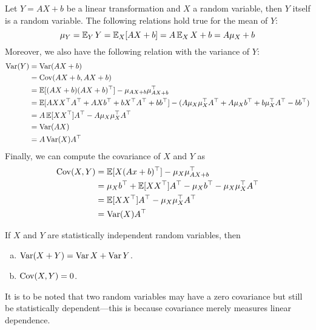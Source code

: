 Let \(Y = A X + b\) be a linear transformation and \(X\) a random variable, then
\(Y\) itself is a random variable. The following relations hold true for the
mean of \(Y\):
\[
    \mu_Y = \operatorname{\mathbb{E}}_Y Y = \operatorname{\mathbb{E}}_X[A X + b] = A \operatorname{\mathbb{E}}_X X + b = A \mu_X + b
\]
Moreover, we also have the following relation with the variance of \(Y\):
\begin{align*}
    \operatorname{Var}(Y)
     & = \operatorname{Var}(A X + b)                                                        \\
     & = \operatorname{Cov}(A X + b, A X + b)                                               \\
     & = \operatorname{\mathbb{E}}[(A X + b)(A X + b)^{\operatorname{\top}}] - \mu_{A X + b} \mu_{A X +
    b}^{\operatorname{\top}}                                                              \\
     & = \operatorname{\mathbb{E}}[
        A X X^{\operatorname{\top}} A^{\operatorname{\top}} + A X b^{\operatorname{\top}} + b X^{\operatorname{\top}} A^{\operatorname{\top}}
        + b b^{\operatorname{\top}}
    ]
    - (A \mu_X \mu_X^{\operatorname{\top}} A^{\operatorname{\top}} + A \mu_X b^{\operatorname{\top}}
    + b \mu_X^{\operatorname{\top}} A^{\operatorname{\top}} - b b^{\operatorname{\top}})                        \\
     & = A \operatorname{\mathbb{E}}[X X^{\operatorname{\top}}] A^{\operatorname{\top}} - A \mu_X \mu_X^{\operatorname{\top}}
    A^{\operatorname{\top}}                                                               \\
     & = \operatorname{Var}(A X)                                                            \\
     & = A \operatorname{Var}(X) A^{\operatorname{\top}}
\end{align*}
Finally, we can compute the covariance of \(X\) and \(Y\) as
\begin{align*}
    \operatorname{Cov}(X, Y)
     & = \operatorname{\mathbb{E}}[X (A x + b)^{\operatorname{\top}}] - \mu_X \mu_{A X + b}^{\operatorname{\top}}         \\
     & = \mu_X b^{\operatorname{\top}} + \operatorname{\mathbb{E}}[X X^{\operatorname{\top}}] A^{\operatorname{\top}}
    - \mu_X b^{\operatorname{\top}} - \mu_X \mu_X^{\operatorname{\top}} A^{\operatorname{\top}}                   \\
     & = \operatorname{\mathbb{E}}[X X^{\operatorname{\top}}] A^{\operatorname{\top}} - \mu_X \mu_X^{\operatorname{\top}} A^{\operatorname{\top}} \\
     & = \operatorname{Var}(X) A^{\operatorname{\top}}
\end{align*}

\begin{lemma}
    \label{lem:statistical-independence-and-cov-var}
    If \(X\) and \(Y\) are statistically independent random variables, then
    \begin{enumerate}[(a)]\setlength\itemsep{0em}
        \item \(\operatorname{Var}(X + Y) = \operatorname{Var} X + \operatorname{Var} Y\).
        \item \(\operatorname{Cov}(X, Y) = 0\).
    \end{enumerate}
    It is to be noted that two random variables may have a zero covariance but
    still be statistically dependent---this is because covariance merely measures
    linear dependence.
\end{lemma}


